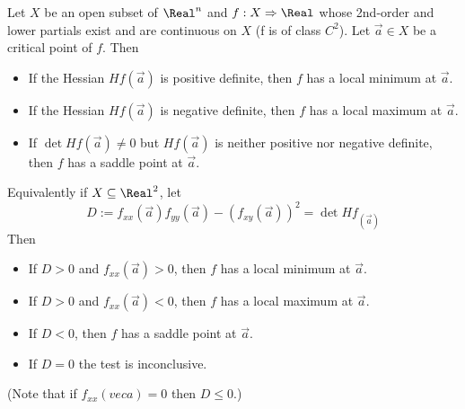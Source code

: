 \begin{theorem}
  Let $X$ be an open subset of $\Real^n$ and $f : X \Rightarrow \Real$ whose 2nd-order and lower partials exist and are continuous on $X$ (f is of class $C^2$). Let $\vec{a} \in X$ be a critical point of $f$. Then
  \begin{itemize}
    \item If the Hessian $Hf(\vec{a})$ is positive definite, then $f$ has a local minimum at $\vec{a}$.
    \item If the Hessian $Hf(\vec{a})$ is negative definite, then $f$ has a local maximum at $\vec{a}$.
    \item If $\det Hf(\vec{a}) \neq 0$ but $Hf(\vec{a})$ is neither positive nor negative definite, then $f$ has a saddle point at $\vec{a}$.
  \end{itemize}

  Equivalently if $X \subseteq \Real^2$, let
  \[
    D := f_{xx}(\vec{a}) f_{yy}(\vec{a}) - \left(f_{xy}(\vec{a})\right)^2 = \det Hf_(\vec{a})
  \]
  Then
  \begin{itemize}
    \item If $D > 0$ and $f_{xx}(\vec{a}) > 0$, then $f$ has a local minimum at $\vec{a}$.
    \item If $D > 0$ and $f_{xx}(\vec{a}) < 0$, then $f$ has a local maximum at $\vec{a}$.
    \item If $D < 0$, then $f$ has a saddle point at $\vec{a}$.
    \item If $D = 0$ the test is inconclusive.
  \end{itemize}

  (Note that if $f_{xx}(vec{a}) = 0$ then $D \leq 0$.)
\end{theorem}

